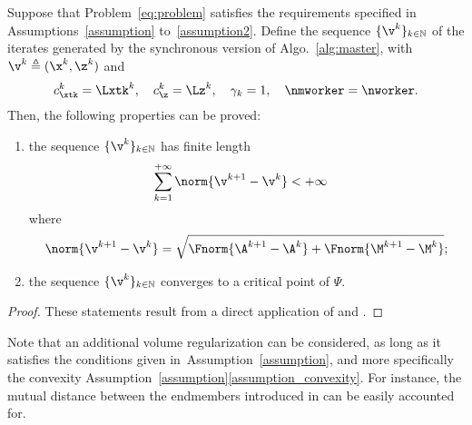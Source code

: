 \documentclass[journal,final,letterpaper,twoside,twocolumn]{IEEEtran}
\begin{document}
\begin{proposition} \label{prop_deterministic}
    Suppose that Problem~\eqref{eq:problem} satisfies the requirements specified in Assumptions~\ref{assumption} to~\ref{assumption2}. Define the sequence $\{ \v^k \}_{k \in \mathbb{N}}$ of the iterates generated by the synchronous version of Algo.~\ref{alg:master}, with $\v^k \triangleq (\x^k,\z^k)$ and
    \begin{equation*}
        c_{\xtk}^k = \Lxtk^k, \quad c_\z^k = \Lz^k, \quad \gamma_k = 1, \quad \nmworker = \nworker.
    \end{equation*}
    Then, the following properties can be proved:
    \begin{enumerate}[label=(\roman*)]
        \item the sequence $\{ \v^k \}_{k \in \mathbb{N}}$ has finite length
        \begin{equation*}
            \begin{split}
                &\sum_{k=1}^{+\infty} \norm{\v^{k+1} - \v^k} < +\infty
            \end{split}
        \end{equation*}
        where
        \begin{equation*}
            \norm{\v^{k+1} - \v^k} = \sqrt{\Fnorm{\A^{k+1} - \A^k} + \Fnorm{\M^{k+1} - \M^k}};
        \end{equation*}
        \item the sequence $\{ \v^k \}_{k \in \mathbb{N}}$ converges to a critical point of $\Psi$.
    \end{enumerate}
\end{proposition}

\begin{proof}
These statements result from a direct application of \cite[Theorem 1, Theorem 3]{Bolte2013} and \cite[Remark 4 (iv)]{Bolte2013}.
\end{proof}

Note that an additional volume regularization can be considered, as long as it satisfies the conditions given in~Assumption~\ref{assumption}, and more specifically the convexity Assumption~\ref{assumption}\ref{assumption_convexity}. For instance, the mutual distance between the endmembers introduced in \cite{Berman2004} can be easily accounted for.
\end{document}
